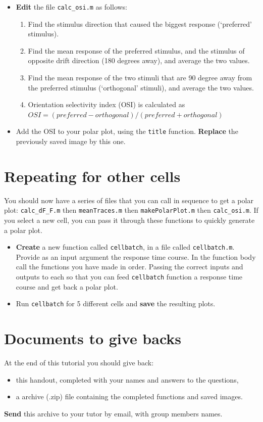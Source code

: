 \documentclass[paper=a4, fontsize=11pt]{article} %
\numberwithin{equation}{section} %
\numberwithin{figure}{section} %
\numberwithin{table}{section} %
\begin{document}
\begin{itemize}
\item \textbf{Edit} the file \texttt{calc\_osi.m} as follows:
  \begin{enumerate}
  \item Find the stimulus direction that caused the biggest response (`preferred' stimulus).
  \item Find the mean response of the preferred stimulus, and the stimulus of opposite drift direction (180 degrees away), and average the two values.
  \item Find the mean response of the two stimuli that are 90 degree away from the preferred stimulus (`orthogonal' stimuli), and average the two values.
  \item Orientation selectivity index (OSI) is calculated as \\ $OSI = {\left(preferred - orthogonal\right)} / {\left(preferred + orthogonal\right)}$
  \end{enumerate}
\item Add the OSI to your polar plot, using the \texttt{title} function.
  \textbf{Replace} the previously saved image by this one.
\end{itemize}


\section{Repeating for other cells}

You should now have a series of files that you can call in sequence to get a polar plot: \texttt{calc\_dF\_F.m} then \texttt{meanTraces.m} then \texttt{makePolarPlot.m} then \texttt{calc\_osi.m}. If you select a new cell, you can pass it through these functions to quickly generate a polar plot. 

\begin{itemize}
\item \textbf{Create} a new function called \texttt{cellbatch}, in a file called \texttt{cellbatch.m}. Provide as an input argument the response time course. In the function body call the functions you have made in order. Passing the correct inputs and outputs to each so that you can feed \texttt{cellbatch} function a response time course and get back a polar plot.
\item Run \texttt{cellbatch} for 5 different cells and \textbf{save} the resulting plots.
\end{itemize}


\section*{Documents to give backs}

At the end of this tutorial you should give back:
\begin{itemize}
  \item this handout, completed with your names and answers to the questions,
  \item a archive (.zip) file containing the completed functions and saved images.
\end{itemize}
\textbf{Send} this archive to your tutor by email, with group members names.
\end{document}
